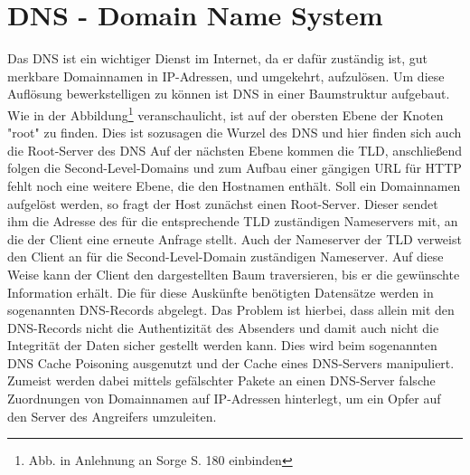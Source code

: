 \chapter{DNS - Domain Name System}
\label{sec:dns}
	Das \ac{DNS} ist ein wichtiger Dienst im Internet, da er dafür zuständig ist, gut merkbare Domainnamen in \ac{IP}-Adressen, und umgekehrt, aufzulösen.
	Um diese Auflösung bewerkstelligen zu können ist \ac{DNS} in einer Baumstruktur aufgebaut. 
	Wie in der Abbildung\footnote{Abb. in Anlehnung an Sorge S. 180 einbinden} veranschaulicht, ist auf der obersten Ebene der Knoten "root" zu finden.
	Dies ist sozusagen die Wurzel des \ac{DNS} und hier finden sich auch die Root-Server des \ac{DNS}
	Auf der nächsten Ebene kommen die \ac{TLD}, anschließend folgen die Second-Level-Domains und zum Aufbau einer gängigen \ac{URL} für \ac{HTTP} fehlt noch eine weitere Ebene, die den Hostnamen enthält.
	Soll ein Domainnamen aufgelöst werden, so fragt der Host zunächst einen Root-Server.
	Dieser sendet ihm die Adresse des für die entsprechende \ac{TLD} zuständigen Nameservers mit, an die der Client eine erneute Anfrage stellt.
	Auch der Nameserver der \ac{TLD} verweist den Client an für die Second-Level-Domain zuständigen Nameserver.
	Auf diese Weise kann der Client den dargestellten Baum traversieren, bis er die gewünschte Information erhält.
	Die für diese Auskünfte benötigten Datensätze werden in sogenannten \ac{DNS}-Records abgelegt.
	Das Problem ist hierbei, dass allein mit den \ac{DNS}-Records nicht die Authentizität des Absenders und damit auch nicht die Integrität der Daten sicher gestellt werden kann.
	Dies wird beim sogenannten \ac{DNS} Cache Poisoning %
 	ausgenutzt und der Cache eines \ac{DNS}-Servers manipuliert.
	Zumeist werden dabei mittels gefälschter Pakete an einen \ac{DNS}-Server falsche Zuordnungen von Domainnamen auf \ac{IP}-Adressen hinterlegt, um ein Opfer auf den Server des Angreifers umzuleiten.
